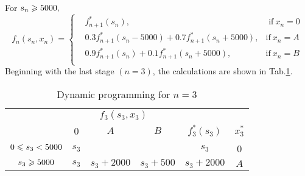 \documentclass[a4paper]{article}
\begin{document}
\begin{enumerate}
\begin{solution}
	For $s_n\geqslant5000,$
	\begin{equation*}f_n(s_n,x_n)=\left\{
		\begin{aligned}	
		&f_{n+1}^*(s_n), &\text{ if}\ x_n=0\, \\
		&0.3f_{n+1}^*(s_n-5000)+0.7f_{n+1}^*(s_n+5000), &\text{if}\ x_n=A\\
		&0.9f_{n+1}^*(s_n)+0.1f_{n+1}^*(s_n+5000), &\text{if}\ x_n=B\\
		\end{aligned}\right.
	\end{equation*}
	Beginning with the last stage $(n=3)$, the calculations are shown in Tab.\ref{tab33}.
	\begin{table}[H]
	  	\centering
	  	\caption{Dynamic programming for $n=3$}
	  	\label{tab33}
	  	\begin{tabular}{cccccc}
	  		\toprule[1.5pt]
	  		&\multicolumn{3}{c}{$f_3(s_3,x_3)$}&\\
	  		\cmidrule{2-4}
	  		\diagbox[width=7em]{$s_3$}{$x_3$}&\hspace*{0.4cm}0\hspace*{0.4cm}&\hspace*{0.4cm}$A$\hspace*{0.4cm}&\hspace*{0.4cm}$B$\hspace*{0.4cm}&$f_3^*(s_3)$&$x_3^*$\\
	  		\midrule
			$0\leqslant s_3<5000$&$s_3$&&&$s_3$&0\\
			$s_3\geqslant5000$&$s_3$&$s_3+2000$&$s_3+500$&$s_3+2000$&$A$\\
	  		\bottomrule[1.5pt]
	  	\end{tabular}
  	\end{table}
	

\end{solution}
\end{enumerate}
\end{document}
